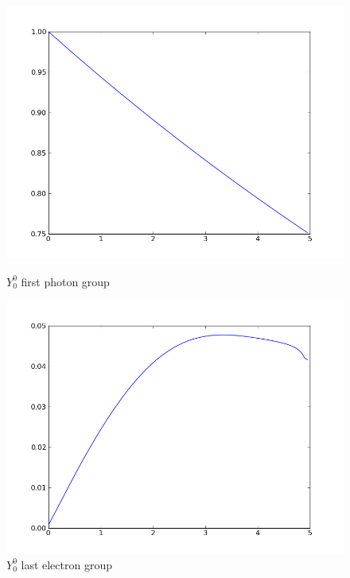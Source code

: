 \begin{figure}[H]
\begin{minipage}[b]{0.45\linewidth}
\centering
\includegraphics[width=\linewidth]{./images/al/group_0_moment_0}
\caption{$Y_0^0$ first photon group}
\end{minipage}
\hspace{0.5cm}
\begin{minipage}[b]{0.45\linewidth}
\centering
\includegraphics[width=\linewidth]{./images/al/group_39_moment_0}
\caption{$Y_0^0$ last electron group}
\end{minipage}
\end{figure}

